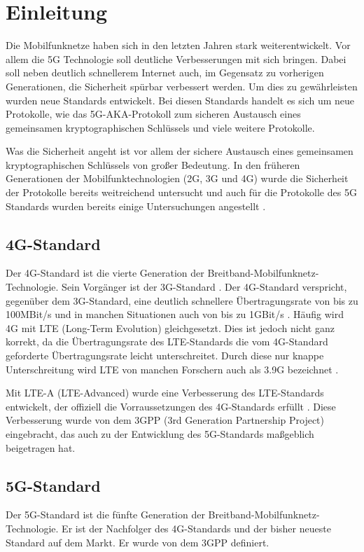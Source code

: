 \chapter{Einleitung}
\label{chap:1}

Die Mobilfunknetze haben sich in den letzten Jahren stark weiterentwickelt. 
Vor allem die 5G Technologie soll deutliche Verbesserungen mit sich bringen. 
Dabei soll neben deutlich schnellerem Internet auch, im Gegensatz zu vorherigen Generationen, die Sicherheit spürbar verbessert werden.
Um dies zu gewährleisten wurden neue Standards entwickelt. 
Bei diesen Standards handelt es sich um neue Protokolle, wie das 5G-AKA-Protokoll zum sicheren Austausch eines gemeinsamen kryptographischen Schlüssels und viele weitere Protokolle.

Was die Sicherheit angeht ist vor allem der sichere Austausch eines gemeinsamen kryptographischen Schlüssels von großer Bedeutung. 
In den früheren Generationen der Mobilfunktechnologien (2G, 3G und 4G) wurde die Sicherheit der Protokolle bereits weitreichend untersucht und auch für die Protokolle des 5G Standards wurden bereits einige Untersuchungen angestellt \cite{Compare}.


\section{4G-Standard}
Der 4G-Standard ist die vierte Generation der Breitband-Mobilfunknetz-Technologie. 
Sein Vorgänger ist der 3G-Standard \cite{5189800}. 
Der 4G-Standard verspricht, gegenüber dem 3G-Standard, eine deutlich schnellere Übertragungsrate von bis zu 100MBit/s und in manchen Situationen auch von bis zu 1GBit/s \cite{itu2008requirements}. 
Häufig wird 4G mit LTE (Long-Term Evolution) gleichgesetzt.
Dies ist jedoch nicht ganz korrekt, da die Übertragungsrate des LTE-Standards die vom 4G-Standard geforderte Übertragungsrate leicht unterschreitet. 
Durch diese nur knappe Unterschreitung wird LTE von manchen Forschern auch als 3.9G bezeichnet \cite{kumaravel2011comparative}. 

Mit LTE-A (LTE-Advanced) wurde eine Verbesserung des LTE-Standards entwickelt, der offiziell die Vorraussetzungen des 4G-Standards erfüllt \cite{6176981}. 
Diese Verbesserung wurde von dem 3GPP (3rd Generation Partnership Project) eingebracht, das auch zu der Entwicklung des 5G-Standards maßgeblich beigetragen hat.


\section{5G-Standard}
Der 5G-Standard ist die fünfte Generation der Breitband-Mobilfunknetz-Technologie.
Er ist der Nachfolger des 4G-Standards und der bisher neueste Standard auf dem Markt.
Er wurde von dem 3GPP definiert.

